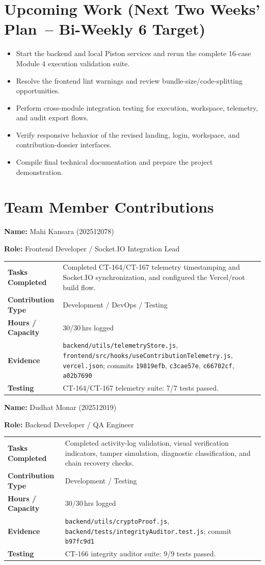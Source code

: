 \documentclass[11pt,a4paper]{article}
\newcommand{\field}[2]{\textbf{#1:} #2\par}
\begin{document}
\section{Upcoming Work (Next Two Weeks' Plan~-- Bi-Weekly 6 Target)}

\begin{itemize}
    \item Start the backend and local Piston services and rerun the complete 16-case Module 4 execution validation suite.
    \item Resolve the frontend lint warnings and review bundle-size/code-splitting opportunities.
    \item Perform cross-module integration testing for execution, workspace, telemetry, and audit export flows.
    \item Verify responsive behavior of the revised landing, login, workspace, and contribution-dossier interfaces.
    \item Compile final technical documentation and prepare the project demonstration.
\end{itemize}

\section{Team Member Contributions}

\field{Name}{Mahi Kansara (202512078)}
\field{Role}{Frontend Developer / Socket.IO Integration Lead}
{\small
\begin{tabular}{>{\bfseries}p{} p{}}
\toprule
Tasks Completed & Completed CT-164/CT-167 telemetry timestamping and Socket.IO synchronization, and configured the Vercel/root build flow. \\
Contribution Type & Development / DevOps / Testing \\
Hours / Capacity & 30/30\,hrs logged \\
Evidence & \texttt{backend/utils/telemetryStore.js}, \texttt{frontend/src/hooks/useContributionTelemetry.js}, \texttt{vercel.json}; commits \texttt{19819efb}, \texttt{c3cae57e}, \texttt{c66702cf}, \texttt{a02b7690} \\
Testing & CT-164/CT-167 telemetry suite: 7/7 tests passed. \\
\bottomrule
\end{tabular}
}

\field{Name}{Dudhat Monar (202512019)}
\field{Role}{Backend Developer / QA Engineer}
{\small
\begin{tabular}{>{\bfseries}p{} p{}}
\toprule
Tasks Completed & Completed activity-log validation, visual verification indicators, tamper simulation, diagnostic classification, and chain recovery checks. \\
Contribution Type & Development / Testing \\
Hours / Capacity & 30/30\,hrs logged \\
Evidence & \texttt{backend/utils/cryptoProof.js}, \texttt{backend/tests/integrityAuditor.test.js}; commit \texttt{b97fc9d1} \\
Testing & CT-166 integrity auditor suite: 9/9 tests passed. \\
\bottomrule
\end{tabular}
}
\end{document}
